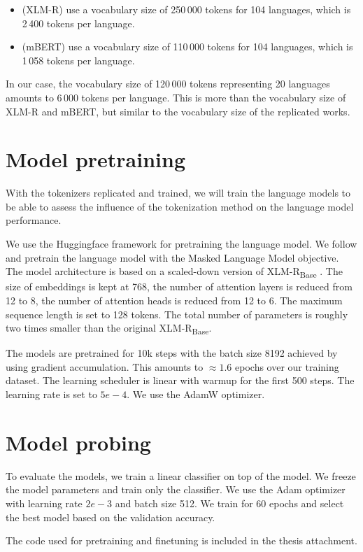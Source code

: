 \begin{itemize}
    \item \citet{conneau_unsupervised_2020-1} (XLM-R) use a vocabulary size of 250\,000 tokens for 104 languages, which is 2\,400 tokens per language.
    \item \citet{devlin_bert_2019} (mBERT) use a vocabulary size of 110\,000 tokens for 104 languages, which is 1\,058 tokens per language.
\end{itemize}

In our case, the vocabulary size of 120\,000 tokens representing 20 languages amounts to 6\,000 tokens per language. This is more than the vocabulary size of XLM-R and mBERT, but similar to the vocabulary size of the replicated works. 

\section{Model pretraining}
\label{sec:model_pretraining}

With the tokenizers replicated and trained, we will train the language models to be able to assess the influence of the tokenization method on the language model performance.

We use the Huggingface framework \cite{wolf_transformers_2020} for pretraining the language model. We follow \citet{conneau_unsupervised_2020} and pretrain the language model with the Masked Language Model objective. The model architecture is based on a scaled-down version of XLM-R\textsubscript{Base} \cite{conneau_unsupervised_2020}. The size of embeddings is kept at 768, the number of attention layers is reduced from 12 to 8, the number of attention heads is reduced from 12 to 6. The maximum sequence length is set to 128 tokens. The total number of parameters is roughly two times smaller than the original XLM-R\textsubscript{Base}.

The models are pretrained for 10k steps with the batch size 8192 achieved by using gradient accumulation. This amounts to $\approx 1.6$ epochs over our training dataset. The learning scheduler is linear with warmup for the first 500 steps. The learning rate is set to $5e-4$. We use the AdamW optimizer.

\section{Model probing}
\label{sec:model_probing}

To evaluate the models, we train a linear classifier on top of the model. We freeze the model parameters and train only the classifier. We use the Adam optimizer with learning rate $2e-3$ and batch size 512. We train for 60 epochs and select the best model based on the validation accuracy.

The code used for pretraining and finetuning is included in the thesis attachment.

